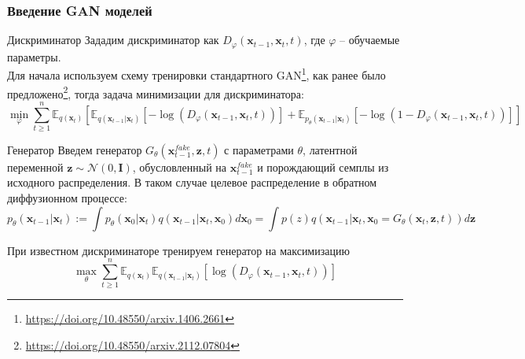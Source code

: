 \documentclass[8pt]{beamer}
\begin{document}
\begin{frame}
	\frametitle{Введение GAN моделей}
	\begin{block}{Дискриминатор}
		Зададим дискриминатор как $D_\varphi(\textbf{x}_{t-1}, \textbf{x}_t, t)$, где $\varphi$ -- обучаемые параметры.\\
		Для начала используем схему тренировки стандартного GAN\footnote{\url{https://doi.org/10.48550/arxiv.1406.2661}}, как ранее было предложено\footnote{\url{https://doi.org/10.48550/arxiv.2112.07804}}, тогда задача минимизации для дискриминатора:
		$$  \min\limits_\varphi\sum\limits_{t\geqslant 1}^n \mathbb{E}_{q(\textbf{x}_t)}[\mathbb{E}_{q(\textbf{x}_{t-1}|\textbf{x}_t)}[-\log{ (D_\varphi(\textbf{x}_{t-1}, \textbf{x}_t, t) ) }] + \mathbb{E}_{p_\theta(\textbf{x}_{t-1}|\textbf{x}_t)}[-\log{  (1 - D_\varphi(\textbf{x}_{t-1}, \textbf{x}_t, t))  }]]$$
		\end{block}
		
	\begin{block}{Генератор}
		Введем генератор $G_\theta(\textbf{x}_{t-1}^{fake}, \textbf{z}, t)$ с параметрами $\theta$, латентной переменной $\textbf{z}\sim \mathcal{N}(0, \textbf{I})$, обусловленный на $\textbf{x}_{t-1}^{fake}$ и порождающий семплы из исходного распределения. В таком случае целевое распределение в обратном диффузионном процессе:
		$$p_\theta(\textbf{x}_{t-1}|\textbf{x}_t) := \int p_\theta(\textbf{x}_0|\textbf{x}_t)q(\textbf{x}_{t-1}|\textbf{x}_t, \textbf{x}_0)d\textbf{x}_0 =\int p(z)q(\textbf{x}_{t-1}|\textbf{x}_t, \textbf{x}_0 = G_\theta(\textbf{x}_t, \textbf{z}, t))d\textbf{z}$$
	\end{block}
		При известном дискриминаторе тренируем генератор на максимизацию 
		\begin{equation*}
			\max\limits_\theta\sum\limits_{t\geqslant 1}^n \mathbb{E}_{q(\textbf{x}_t)}\mathbb{E}_{q(\textbf{x}_{t-1}|\textbf{x}_t)}[\log{(D_\varphi(\textbf{x}_{t-1}, \textbf{x}_t, t))}]
		\end{equation*}
\end{frame}
\end{document}
